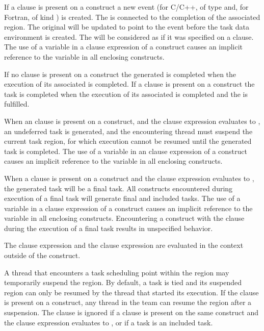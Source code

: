 If a  clause is present on a  construct a new event 
 (for C/C++, of type  and, for 
Fortran, of kind  ) is created. The 
 is connected to the completion of the associated 
 region. The original  will be updated to point 
to the  event before the task data environment is 
created. The  will be considered as if it was specified on 
a  clause. The use of a variable in a  clause 
expression of a  construct causes an implicit reference to the 
variable in all enclosing constructs.

If no  clause is present on a  construct the generated 
 is completed when the execution of its associated  
is completed. If a  clause is present on a  construct 
the task is completed when the execution of its associated  
is completed and the  is fulfilled.

When an  clause is present on a  construct, and the  
clause expression evaluates to , an undeferred task is generated, and 
the encountering thread must suspend the current task region, for which execution 
cannot be resumed until the generated task is completed. The use of a variable in 
an  clause expression of a  construct causes an implicit 
reference to the variable in all enclosing constructs.

When a  clause is present on a  construct and the 
 clause expression evaluates to , the generated task 
will be a final task. All  constructs encountered during execution 
of a final task will generate final and included tasks. The use of a variable 
in a  clause expression of a  construct causes an
implicit reference to the variable in all enclosing constructs. Encountering 
a  construct with the  clause during the execution 
of a final task results in unspecified behavior.

The  clause expression and the  clause expression are 
evaluated in the context outside of the  construct.

A thread that encounters a task scheduling point within the  region 
may temporarily suspend the  region. By default, a task is tied and 
its suspended  region can only be resumed by the thread that started 
its execution. If the  clause is present on a  construct, 
any thread in the team can resume the  region after a suspension. The 
 clause is ignored if a  clause is present on the same 
 construct and the  clause expression evaluates to 
, or if a task is an included task.

